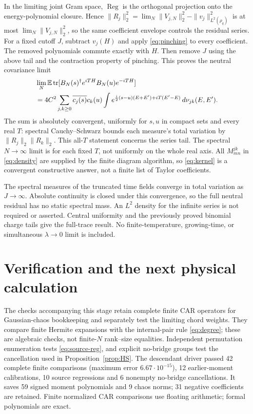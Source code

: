 \documentclass[11pt]{article}
\newcommand{\EE}{\mathbb E}
\newcommand{\tr}{\operatorname{tr}}
\newcommand{\Reg}{\operatorname{Reg}}
\begin{document}
In the limiting joint Gram space, $\Reg$ is the orthogonal
projection onto the energy-polynomial closure. Hence
$\|R_j\|_2^2=\lim_N\|V_{j,N}\|_2^2-\|v_j\|_{L^2(\rho_q)}^2$
is at most $\lim_N\|V_{j,N}\|_2^2$, so the same coefficient
envelope controls the residual series.
For a fixed cutoff $J$, subtract $v_j(H)$ and apply
\eqref{eq:pinching} to every coefficient. The removed polynomials
commute exactly with $H$. Then remove $J$ using the above tail and
the contraction property of pinching. This proves the neutral
covariance limit
\begin{align}
 &\lim_N\EE\tr[B_N(s)^\dagger e^{iTH}B_N(u)e^{-iTH}]
 \notag\\
 &=4C^2\sum_{j,k\ge0}\overline{c_j(s)}c_k(u)
 \int e^{\frac i2(s-u)(E+E')+iT(E'-E)}\,d\nu_{jk}(E,E').
 \label{eq:kernel}
\end{align}
The sum is absolutely convergent, uniformly for $s,u$ in compact
sets and every real $T$: spectral Cauchy--Schwarz bounds each
measure's total variation by $\|R_j\|_2\|R_k\|_2$.
This all-$T$ statement concerns the series tail. The spectral
$N\to\infty$ limit is for each fixed $T$, not uniformly on the
whole real axis.
All $M^{jk}_{mn}$ in \eqref{eq:density} are supplied by the finite
diagram algorithm, so \eqref{eq:kernel} is a convergent constructive
answer, not a finite list of Taylor coefficients.

The spectral measures of the truncated time fields converge in
total variation as $J\to\infty$. Absolute continuity is closed
under this convergence, so the full neutral residual has no static
spectral mass. An $L^2$ density for the infinite series is not
required or asserted. Central uniformity and the previously proved
binomial charge tails give the full-trace result. No finite-temperature,
growing-time, or simultaneous $\lambda\to0$ limit is included.

\newpage
\section{Verification and the next physical calculation}
The checks accompanying this stage retain complete finite CAR
operators for Gaussian-chaos bookkeeping and separately test the
limiting chord weights. They compare finite Hermite expansions
with the internal-pair rule \eqref{eq:degree}; these are algebraic
checks, not finite-$N$ rank--size equalities. Independent permutation
enumeration tests \eqref{eq:source-reg}, and explicit no-bridge
groups test the cancellation used in Proposition~\ref{prop:HS}.
The descendant driver passed 42 complete finite comparisons
(maximum error $6.67\cdot10^{-15}$), 12 earlier-moment calibrations,
10 source regressions and 6 nonempty no-bridge cancellations.
It saves 59 signed moment polynomials and 9 chaos norms;
31 negative coefficients are retained. Finite normalized CAR
comparisons use floating arithmetic; formal polynomials are exact.
\end{document}

